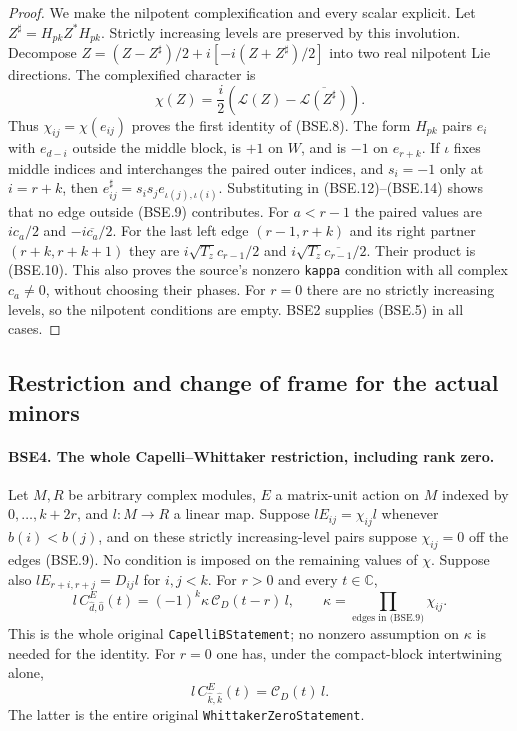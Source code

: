 \documentclass[11pt,a4paper]{article}
\numberwithin{equation}{section}
\theoremstyle{remark}\newtheorem{remark}[theorem]{Remark}
\begin{document}
\begin{proof}
We make the nilpotent complexification and every scalar explicit.
Let $Z^\sharp=H_{pk}Z^*H_{pk}$.  Strictly increasing levels are
preserved by this involution.  Decompose
$Z=(Z-Z^\sharp)/2+i[-i(Z+Z^\sharp)/2]$ into two real
nilpotent Lie directions.  The complexified character is
\[
 \chi(Z)=\frac i2
       \left(\mathcal L(Z)-\overline{\mathcal L(Z^\sharp)}\right).
 \tag{BSE.14}
\]
Thus $\chi_{ij}=\chi(e_{ij})$ proves the first identity of (BSE.8).
The form $H_{pk}$ pairs $e_i$ with $e_{d-i}$ outside the middle
block, is $+1$ on $W$, and is $-1$ on $e_{r+k}$.
If $\iota$ fixes middle indices and interchanges the paired outer
indices, and $s_i=-1$ only at $i=r+k$, then
$e_{ij}^\sharp=s_is_j e_{\iota(j),\iota(i)}$.
Substituting in (BSE.12)--(BSE.14) shows that no edge outside
(BSE.9) contributes.  For $a<r-1$ the paired values are
$ic_a/2$ and $-i\overline{c_a}/2$.
For the last left edge $(r-1,r+k)$ and its right partner
$(r+k,r+k+1)$ they are
$i\sqrt{T_z}c_{r-1}/2$ and
$i\sqrt{T_z}\overline{c_{r-1}}/2$.
Their product is (BSE.10).
This also proves the source's nonzero \texttt{kappa} condition
with all complex $c_a\ne0$, without choosing their phases.
For $r=0$ there are no strictly increasing levels, so the nilpotent
conditions are empty.  BSE2 supplies (BSE.5) in all cases.
\end{proof}

\subsection{Restriction and change of frame for the actual minors}

\paragraph{BSE4. The whole Capelli--Whittaker restriction, including rank zero.}
\label{claim:BSE4}
Let $M,R$ be arbitrary complex modules, $E$ a matrix-unit action
on $M$ indexed by $0,\ldots,k+2r$, and
$l:M\to R$ a linear map.  Suppose
$lE_{ij}=\chi_{ij}l$ whenever $b(i)<b(j)$, and on these
strictly increasing-level pairs suppose $\chi_{ij}=0$ off the
edges (BSE.9).  No condition is imposed on the remaining values
of $\chi$.  Suppose also
$lE_{r+i,r+j}=D_{ij}l$ for $i,j<k$.
For $r>0$ and every $t\in\mathbb C$,
\[
 l\,C^E_{\widehat d,\widehat0}(t)
       =(-1)^k\kappa\,\mathcal C_D(t-r)\,l,
       \qquad \kappa=\prod_{\text{edges in (BSE.9)}}\chi_{ij}.
 \tag{BSE.15}
\]
This is the whole original \texttt{Capelli\allowbreak BStatement}; no nonzero
assumption on $\kappa$ is needed for the identity.
For $r=0$ one has, under the compact-block intertwining alone,
\[
                   l\,C^E_{\widehat k,\widehat k}(t)
                                =\mathcal C_D(t)\,l.
 \tag{BSE.16}
\]
The latter is the entire original \texttt{Whittaker\allowbreak Zero\allowbreak Statement}.
\end{document}
